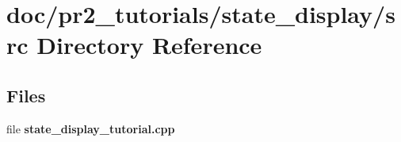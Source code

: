 \section{doc/pr2\-\_\-tutorials/state\-\_\-display/src Directory Reference}
\label{dir_8fe2649d52ec492b476383749c83db84}
\subsection*{Files}
\begin{DoxyCompactItemize}
\item 
file {\bfseries state\-\_\-display\-\_\-tutorial.\-cpp}
\end{DoxyCompactItemize}
